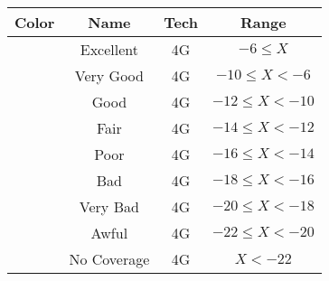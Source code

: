 \begin{tabular}{|c|c|c|c|}\hline
\rowcolor{Plum!20}
Color&Name&Tech&Range\\\hline\hline
\cellcolor[HTML]{00703c} &Excellent&4G&$-6\leq X$\\\hline
\cellcolor[HTML]{00a032} &Very Good&4G&$-10\leq X<-6$\\\hline
\cellcolor[HTML]{00d228} &Good&4G&$-12\leq X<-10$\\\hline
\cellcolor[HTML]{ffff00} &Fair&4G&$-14\leq X<-12$\\\hline
\cellcolor[HTML]{ffaa00} &Poor&4G&$-16\leq X<-14$\\\hline
\cellcolor[HTML]{fa6400} &Bad&4G&$-18\leq X<-16$\\\hline
\cellcolor[HTML]{dc143c} &Very Bad&4G&$-20\leq X<-18$\\\hline
\cellcolor[HTML]{820000} &Awful&4G&$-22\leq X<-20$\\\hline
\cellcolor[HTML]{aaaaaa} &No Coverage&4G&$X<-22$\\\hline
\end{tabular}
